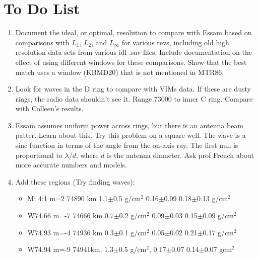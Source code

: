 \documentclass[crop=false,class=book]{standalone}
\begin{document}
        \section{To Do List}
            \begin{enumerate}
                \item Document the ideal, or optimal, resolution
                      to compare
                      with Essam based on comparisons with $L_{1}$,
                      $L_{2}$, and $L_{\infty}$ for various revs,
                      including
                      old high resolution data sets from various idl .sav
                      files. Include documentation on the effect of using
                      different windows for these comparisons. Show that
                      the best match uses a window (KBMD20) that is not
                      mentioned in MTR86.
                \item Look for waves in the D ring to compare
                      with VIMs data.
                      If these are dusty rings, the radio data shouldn't
                      see it. Range 73000 to inner C ring. Compare with
                      Colleen's results.
                \item Essam assumes uniform power across rings,
                      but there is
                      an antenna beam patter. Learn about this. Try this
                      problem on a square well.
                      The wave is a sinc function
                      in terms of the angle from the on-axis ray.
                      The first null is proportional to
                      $\lambda/d$, where
                      $d$ is the antenna diameter. Ask prof French about
                      more accurate numbers and models.
                \item Add these regions (Try finding waves):
                \begin{itemize}
                    \item Mi 4:1 m=2  74890 km  1.1$\pm$0.5 g/$\textrm{cm}^2$  0.16$\pm$0.09  0.18$\pm$0.13 g/$\textrm{cm}^2$
                    \item W74.66 m=-7 74666 km  0.7$\pm$0.2 g/$\textrm{cm}^2$  0.09$\pm$0.03  0.15$\pm$0.09 g/$\textrm{cm}^2$
                    \item W74.93 m=-4 74936 km  0.3$\pm$0.1 g/$\textrm{cm}^2$  0.05$\pm$0.02  0.21$\pm$0.17 g/$\textrm{cm}^2$
                    \item W74.94 m=-9 74941km,  1.3$\pm$0.5 g/$\textrm{cm}^2$, 0.17$\pm$0.07  0.14$\pm$0.07 g$\textrm{cm}^2$

\end{itemize}
\end{enumerate}
\end{document}
